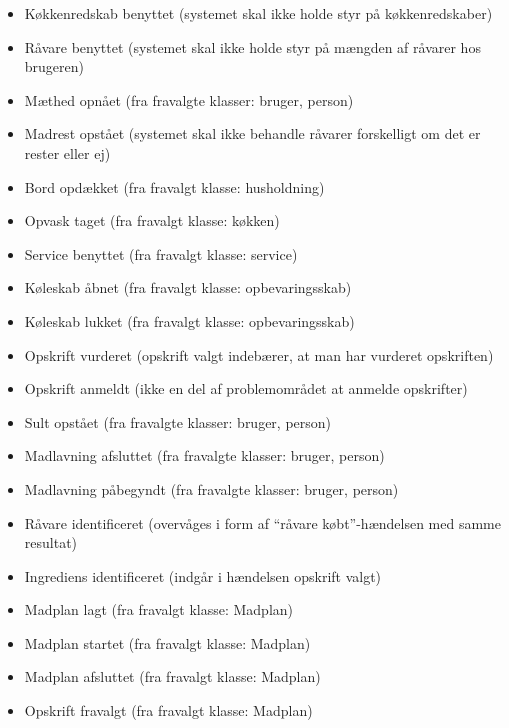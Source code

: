 \begin{itemize} [noitemsep]
\item Køkkenredskab benyttet (systemet skal ikke holde styr på køkkenredskaber)
\item Råvare benyttet (systemet skal ikke holde styr på mængden af råvarer hos brugeren)
\item Mæthed opnået (fra fravalgte klasser: bruger, person)
\item Madrest opstået (systemet skal ikke behandle råvarer forskelligt om det er rester eller ej)
\item Bord opdækket (fra fravalgt klasse: husholdning)
\item Opvask taget (fra fravalgt klasse: køkken)
\item Service benyttet (fra fravalgt klasse: service)
\item Køleskab åbnet (fra fravalgt klasse: opbevaringsskab)
\item Køleskab lukket (fra fravalgt klasse: opbevaringsskab)
\item Opskrift vurderet (opskrift valgt indebærer, at man har vurderet opskriften)
\item Opskrift anmeldt (ikke en del af problemområdet at anmelde opskrifter)
\item Sult opstået (fra fravalgte klasser: bruger, person)
\item Madlavning afsluttet (fra fravalgte klasser: bruger, person)
\item Madlavning påbegyndt (fra fravalgte klasser: bruger, person)
\item Råvare identificeret (overvåges i form af “råvare købt”-hændelsen med samme resultat)
\item Ingrediens identificeret (indgår i hændelsen opskrift valgt)
\item Madplan lagt (fra fravalgt klasse: Madplan)
\item Madplan startet (fra fravalgt klasse: Madplan)
\item Madplan afsluttet (fra fravalgt klasse: Madplan)
\item Opskrift fravalgt (fra fravalgt klasse: Madplan)
\end{itemize}